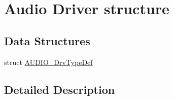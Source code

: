 \hypertarget{group___a_u_d_i_o___driver__structure}{}\section{Audio Driver structure}
\label{group___a_u_d_i_o___driver__structure}
\subsection*{Data Structures}
\begin{DoxyCompactItemize}
\item 
struct \mbox{\hyperlink{struct_a_u_d_i_o___drv_type_def}{A\+U\+D\+I\+O\+\_\+\+Drv\+Type\+Def}}
\end{DoxyCompactItemize}


\subsection{Detailed Description}
